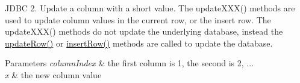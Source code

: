 J\+D\+BC 2. Update a column with a short value. The update\+X\+X\+X() methods are used to update column values in the current row, or the insert row. The update\+X\+X\+X() methods do not update the underlying database, instead the \mbox{\hyperlink{classcom_1_1mysql_1_1jdbc_1_1_updatable_result_set_a919969ba4b3c7cbc7b18605e9f31a746}{update\+Row()}} or \mbox{\hyperlink{classcom_1_1mysql_1_1jdbc_1_1_updatable_result_set_aef041f8d9d0778083716fc26652648fa}{insert\+Row()}} methods are called to update the database.


\begin{DoxyParams}{Parameters}
{\em column\+Index} & the first column is 1, the second is 2, ... \\
\hline
{\em x} & the new column value\\
\hline
\end{DoxyParams}

